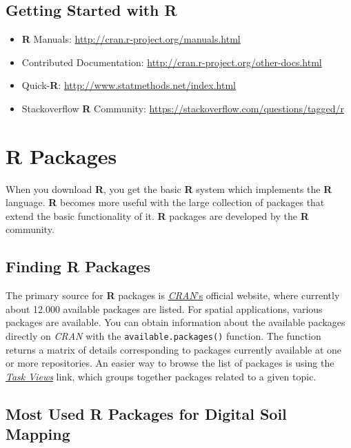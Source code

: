 \documentclass[10pt,b5paper,]{book}
\providecommand{\tightlist}{%
  \setlength{\itemsep}{0pt}\setlength{\parskip}{0pt}}
\theoremstyle{definition}
\theoremstyle{definition}
\theoremstyle{definition}
\theoremstyle{remark}
\begin{document}
\hypertarget{getting-started-with-r}{%
\subsection{Getting Started with R}\label{getting-started-with-r}}

\begin{itemize}
\tightlist
\item
  \textbf{R} Manuals: \url{http://cran.r-project.org/manuals.html}
\item
  Contributed Documentation:
  \url{http://cran.r-project.org/other-docs.html}
\item
  Quick-\textbf{R}: \url{http://www.statmethods.net/index.html}
\item
  Stackoverflow \textbf{R} Community:
  \url{https://stackoverflow.com/questions/tagged/r}
\end{itemize}

\hypertarget{r-packages}{%
\section{R Packages}\label{r-packages}}

When you download \textbf{R}, you get the basic \textbf{R} system which
implements the \textbf{R} language. \textbf{R} becomes more useful with
the large collection of packages that extend the basic functionality of
it. \textbf{R} packages are developed by the \textbf{R} community.

\hypertarget{finding-r-packages}{%
\subsection{Finding R Packages}\label{finding-r-packages}}

The primary source for \textbf{R} packages is
\href{https://cran.r-project.org/}{\emph{CRAN}'s} official website,
where currently about 12.000 available packages are listed. For spatial
applications, various packages are available. You can obtain information
about the available packages directly on \emph{CRAN} with the
\texttt{available.packages()} function. The function returns a matrix of
details corresponding to packages currently available at one or more
repositories. An easier way to browse the list of packages is using the
\href{https://cran.r-project.org/web/views/}{\emph{Task Views}} link,
which groups together packages related to a given topic.

\hypertarget{most-used-r-packages-for-digital-soil-mapping}{%
\subsection{Most Used R Packages for Digital Soil
Mapping}\label{most-used-r-packages-for-digital-soil-mapping}}
\end{document}
